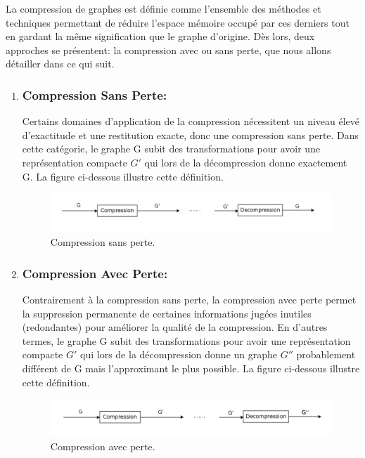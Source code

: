 La compression de graphes est définie comme l'ensemble des méthodes et techniques permettant de réduire l'espace mémoire occupé par ces derniers tout en gardant la même signification que le graphe d'origine. Dès lors, deux approches se présentent: la compression avec ou sans perte, que nous allons détailler dans ce qui suit.
			
			\begin{enumerate}[label=\alph*)]
			\item \subsubsection{Compression Sans Perte:}
			Certains domaines d'application de la compression nécessitent un niveau élevé d'exactitude et une restitution exacte, donc une compression sans perte. Dans cette catégorie, le graphe G subit des transformations pour avoir une représentation compacte $G'$ qui lors de la décompression donne exactement G. La figure ci-dessous illustre cette définition. 
			
			\begin{figure}[h]
			\includegraphics[scale=0.15,center]{./ressources/image/SansPerte.png}
			\caption[Compression sans perte.]{Compression sans perte.}
			\end{figure}
			
			
			\item \subsubsection{Compression Avec Perte:}
			Contrairement à la compression sans perte, la compression avec perte permet la suppression permanente de certaines informations jugées inutiles (redondantes) pour améliorer la qualité de la compression.  En d'autres termes, le graphe G subit des transformations pour avoir une représentation compacte $G'$ qui lors de la décompression donne un graphe $G''$ probablement différent de G mais l'approximant le plus possible. La figure ci-dessous illustre cette définition.   
			
			\begin{figure}[h]
			\includegraphics[scale=0.15,center]{./ressources/image/AvecPerte.png}
			\caption[Compression avec perte.]{Compression avec perte.}
			\end{figure}
			
				\end{enumerate}
			
			
			